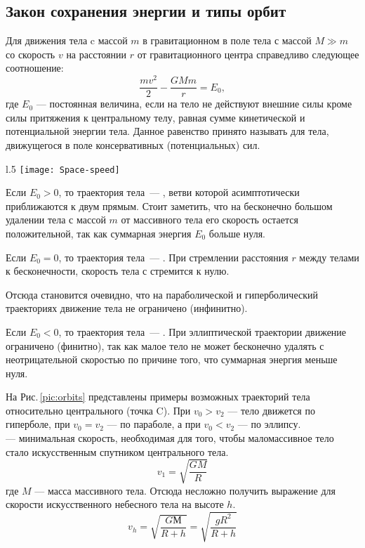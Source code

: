 \subsection{Закон сохранения энергии и типы орбит}
Для движения тела c массой $m$ в гравитационном  в поле тела 
с массой \linebreak $M\gg m$ со скорость $v$ на расстоянии $r$ от 
гравитационного центра справедливо следующее соотношение: 
\begin{equation}
\frac{m v^2}{2}-\frac{GM m }{r}=E_0,
\end{equation}
где $E_0$ --- постоянная величина, если на тело не действуют
внешние силы кроме силы притяжения к центральному телу, 
равная сумме кинетической и потенциальной энергии тела. Данное равенство принято называть  для тела, движущегося в поле консервативных (потенциальных) сил.

\begin{wrapfigure}[11]{l}{.5\tw}
	\centering
	\vspace{-1.2pc}
	\texttt{[image: Space-speed]}
	\caption{Возможные траектории тела \label{pic:orbits}}
\end{wrapfigure}
Если $E_0>0$, то траектория тела~--- , 
ветви которой асимптотически приближаются к двум прямым. Стоит заметить,
что на бесконечно большом удалении тела с массой $m$ от массивного тела
его скорость остается положительной, так как суммарная энергия $E_0$ 
больше нуля.

Если $E_0=0$, то траектория тела~--- . При стремлении
расстояния $r$ между телами к бесконечности, скорость тела с стремится к нулю.

Отсюда становится очевидно, что на параболической и гиперболический
 траекториях движение тела не ограничено (инфинитно). 

Если $E_0<0$, то траектория тела~--- . При 
эллиптической траектории движение ограничено (финитно), так как малое тело
не может бесконечно удалять с неотрицательной скоростью по причине того,
что суммарная энергия меньше нуля.

На Рис.\,\ref{pic:orbits} представлены примеры возможных траекторий тела 
относительно центрального (точка C). При $v_0 > v_{2}$ --- тело движется 
по гиперболе, при $v_0 = v_{2}$ --- по параболе, 
а при $v_0 < v_{2}$ --- по эллипсу.\\

 --- минимальная скорость, необходимая для 
того, чтобы маломассивное тело стало искусственным спутником центрального тела.
\begin{equation}v_1=\sqrt{\frac{GM}{R}}
\end{equation}
где $M$ --- масса массивного тела. Отсюда несложно получить выражение для
скорости искусственного небесного тела на высоте 
$h$.\begin{equation}v_h=\sqrt{\frac{GМ}{R+h}}=\sqrt{\frac{gR^2}{R+h}}
\end{equation}

